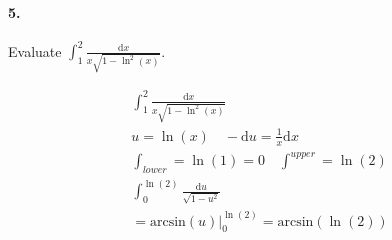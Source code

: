     \paragraph*{5.}
    Evaluate $\int_1^2 \frac{\mathrm{d}x}{x\sqrt{1-\ln^2(x)}}$.
    \\
    \begin{mdframed}
        \begin{equation*}
            \begin{gathered}
                \int_1^2\frac{\mathrm{d}x}{x\sqrt{1-\ln^2(x)}}                  \\
                u = \ln(x) \quad -\mathrm{d}u = \frac{1}{x}\mathrm{d}x          \\
                \int_{lower} = \ln(1) = 0 \quad \int^{upper} = \ln(2)           \\
                \int_{0}^{\ln(2)}\frac{\mathrm{d}u}{\sqrt{1-u^2}}               \\
                = \text{arcsin}(u)\Big|_{0}^{\ln(2)} = \boxed{\text{arcsin}(\ln(2))}
            \end{gathered}
        \end{equation*}
    \end{mdframed}

